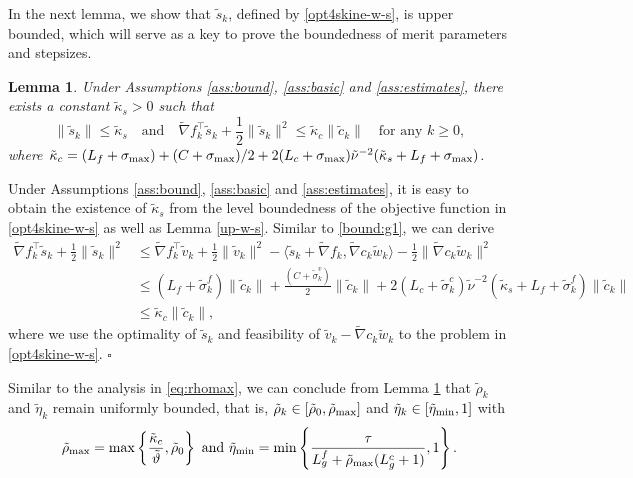 \documentclass[11pt]{article}
\newenvironment{proof}{{\noindent\it Proof.}\quad}{\hfill $\square$\par}
\newcommand{\be}{\begin{equation}}
\newcommand{\ee}{\end{equation}}
\newtheorem{lemma}{Lemma}
\begin{document}
In the next lemma, we  show that $\tilde s_k$, defined by \eqref{opt4skine-w-s}, is upper bounded, which will serve as a key to prove the boundedness of merit parameters and stepsizes. 
\begin{lemma}\label{tilde_kapp}
Under Assumptions \ref{ass:bound}, \ref{ass:basic} and \ref{ass:estimates}, there exists a constant $\tilde \kappa_s>0$ such that   
\[\mbox{$\|\tilde s_k\| \leq \tilde \kappa_s$}\quad\mbox{and}\quad \tilde \nabla f_k^\top \tilde s_k + \frac{1}{2}\|\tilde s_k\|^2  \le \tilde\kappa_c\|\tilde c_k\| \quad \mbox{for any } k\ge0,\]
where 
\(\tilde\kappa_c = (L_f+\sigma_{\rm max})  + {(C+\sigma_{\rm max})}/{2} + 2(L_c+\sigma_{\rm max})\tilde \nu^{-2} (\tilde \kappa_s + L_f + \sigma_{\rm max})\).
\end{lemma}
\begin{proof}
    Under Assumptions \ref{ass:bound}, \ref{ass:basic} and \ref{ass:estimates}, it is easy to obtain the existence of $\tilde\kappa_s$ from the level boundedness of the objective function in \eqref{opt4skine-w-s} as well as Lemma \ref{up-w-s}.  Similar to  \eqref{bound:g1}, we can derive 
   \be\begin{aligned}\label{bound:g2}
    \tilde \nabla f_k^\top \tilde s_k + \frac{1}{2}\|\tilde s_k\|^2 
    &\leq \tilde \nabla f_k^\top \tilde v_k + \frac{1}{2}\|\tilde v_k\|^2 - \langle \tilde s_k + \tilde \nabla f_k , \tilde \nabla c_k \tilde w_k \rangle - \frac{1}{2}\|\tilde \nabla c_k \tilde w_k\|^2\\
    &\leq (L_f+\tilde \sigma_k^f) \|\tilde c_k\| + \frac{(C+\tilde \sigma_k^v)}{2} \|\tilde c_k\| + 2(L_c+\tilde \sigma_k^c)\tilde \nu^{-2} (\tilde \kappa_s + L_f + \tilde \sigma_k^f) \|\tilde c_k\|\\
    & \leq \tilde \kappa_c \|\tilde c_k\|,
\end{aligned}\ee
where we use the optimality of $\tilde s_k$ and feasibility of $\tilde v_k - \tilde \nabla c_k \tilde w_k$ to the problem in  \eqref{opt4skine-w-s}.
\end{proof}



Similar to the analysis in \eqref{eq:rhomax}, we can conclude  from Lemma \ref{tilde_kapp} that $\tilde{\rho}_k$ and $\tilde{\eta}_k$ remain uniformly bounded, that is, 
$\tilde{\rho}_k \in [\tilde \rho_0, \tilde{\rho}_{\rm max}]$ and $\tilde{\eta}_k \in [\tilde{\eta}_{\rm min}, 1]$ with
\begin{align}\label{tilderhomax-etamin}
    \tilde{\rho}_{\rm max} = \max \left\{\frac{\tilde \kappa_c}{\tilde \vartheta},\tilde \rho_0\right\} ~{\rm and}~\tilde \eta_{\rm min} = \min \left\{\frac{\tau}{L_g^f + \tilde \rho_{\rm max} (L_g^c+1)}, 1\right\}.
\end{align}
\end{document}
